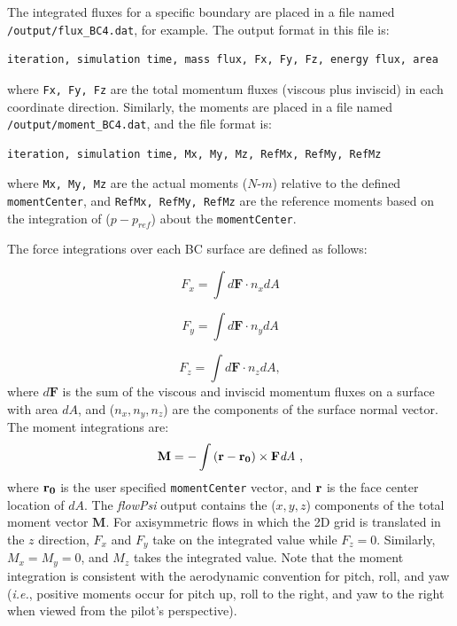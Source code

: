 \documentclass{article}
\begin{document}
The integrated fluxes for a specific boundary are placed in a file named \verb!/output/flux_BC4.dat!, for example.  The output format in this file is:
\begin{verbatim}
iteration, simulation time, mass flux, Fx, Fy, Fz, energy flux, area
\end{verbatim}
where \verb!Fx, Fy, Fz! are the total momentum fluxes (viscous plus inviscid) in each coordinate direction.  Similarly, the moments are placed in a file named \verb!/output/moment_BC4.dat!, and the file format is:
\begin{verbatim}
iteration, simulation time, Mx, My, Mz, RefMx, RefMy, RefMz
\end{verbatim}
where \verb!Mx, My, Mz! are the actual moments ($N$-$m$) relative to the defined \verb!momentCenter!, and \verb!RefMx, RefMy, RefMz! are the reference moments based on the integration of ({\it{$p - p_{ref}$}}) about the \verb!momentCenter!.

The force integrations over each BC surface are defined as follows:

\begin{equation}
F_x = \int{d\textbf{F} \cdot n_x dA}
\end{equation}

\begin{equation}
F_y = \int{d\textbf{F} \cdot n_y dA}
\end{equation}

\begin{equation}
F_z = \int{d\textbf{F} \cdot n_z dA},
\end{equation}
where $d\textbf{F}$ is the sum of the viscous and inviscid momentum fluxes on a surface with area $dA$, and ($n_x,n_y,n_z$) are the components of the surface normal vector.  The moment integrations are:
\begin{equation}
\textbf{M} = - \int{ \bf{(r - r_0)} \times \textbf{F} \textit{dA}} ~ ,
\end{equation}
where $\bf{r_0}$ is the user specified \verb!momentCenter! vector, and
$\bf{r}$ is the face center location of $dA$.  The {\em flowPsi}
output contains the ($x,y,z$) components of the total moment vector
$\textbf{M}$.  For axisymmetric flows in which the 2D grid is
translated in the $z$ direction, $F_x$ and $F_y$ take on the
integrated value while $F_z = 0$.  Similarly, $M_x = M_y = 0$, and
$M_z$ takes the integrated value.  Note that the moment integration is
consistent with the aerodynamic convention for pitch, roll, and yaw
({\it{i.e.}}, positive moments occur for pitch up, roll to the right,
and yaw to the right when viewed from the pilot's perspective).
\end{document}
